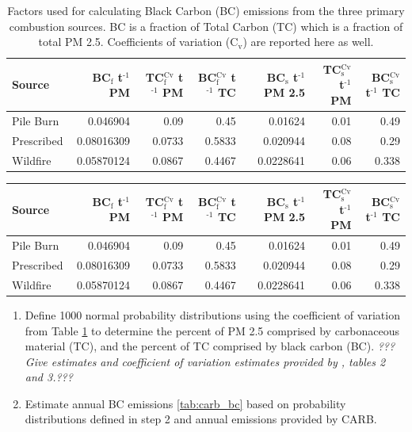 \documentclass[a4paper]{article}
\begin{document}
\begin{table}[htb]
\caption{Factors used for calculating Black Carbon (BC) emissions from the three primary combustion sources. BC is a fraction of Total Carbon (TC) which is a fraction of total PM 2.5. Coefficients of variation (C$_{\text{v}}$) are reported here as well. \label{tab:bc_pm}}
\centering
\begin{tabular}{lrrrrrr}
Source & BC$_{\text{f}}$ t$^{\text{-1}}$ PM & TC$_{\text{f}}^{\text{Cv}}$ t$^{\text{-1}}$ PM & BC$_{\text{f}}^{\text{Cv}}$ t$^{\text{-1}}$ TC & BC$_{\text{s}}$ t$^{\text{-1}}$ PM 2.5 & TC$_{\text{s}}^{\text{Cv}}$ t$^{\text{-1}}$ PM & BC$_{\text{s}}^{\text{Cv}}$ t$^{\text{-1}}$ TC\\
\hline
Pile Burn & 0.046904 & 0.09 & 0.45 & 0.01624 & 0.01 & 0.49\\
Prescribed & 0.08016309 & 0.0733 & 0.5833 & 0.020944 & 0.08 & 0.29\\
Wildfire & 0.05870124 & 0.0867 & 0.4467 & 0.0228641 & 0.06 & 0.338\\
\end{tabular}
\end{table}

\begin{center}
\begin{tabular}{lrrrrrr}
Source & BC$_{\text{f}}$ t$^{\text{-1}}$ PM & TC$_{\text{f}}^{\text{Cv}}$ t$^{\text{-1}}$ PM & BC$_{\text{f}}^{\text{Cv}}$ t$^{\text{-1}}$ TC & BC$_{\text{s}}$ t$^{\text{-1}}$ PM 2.5 & TC$_{\text{s}}^{\text{Cv}}$ t$^{\text{-1}}$ PM & BC$_{\text{s}}^{\text{Cv}}$ t$^{\text{-1}}$ TC\\
\hline
Pile Burn & 0.046904 & 0.09 & 0.45 & 0.01624 & 0.01 & 0.49\\
Prescribed & 0.08016309 & 0.0733 & 0.5833 & 0.020944 & 0.08 & 0.29\\
Wildfire & 0.05870124 & 0.0867 & 0.4467 & 0.0228641 & 0.06 & 0.338\\
\end{tabular}
\end{center}


\begin{enumerate}
\item Define 1000 normal probability distributions using the coefficient
of variation from Table \ref{tab:bc_pm} to determine the percent of PM 2.5
comprised by carbonaceous material (TC), and the percent of TC comprised
by black carbon (BC). \emph{\emph{???Give estimates and coefficient of variation
estimates provided by \citet{Ward1989}, tables 2 and 3.???}}

\item Estimate annual BC emissions \ref{tab:carb_bc} based on probability distributions
defined in step 2 and annual emissions provided by CARB.
\end{enumerate}
\end{document}
